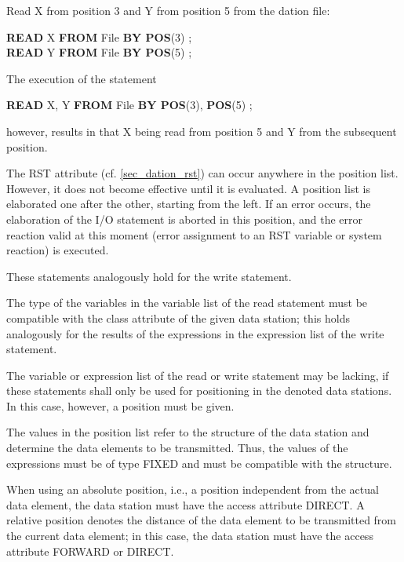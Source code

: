 Read X from position 3 and Y from position 5 from the dation file:

{\bf READ} X {\bf FROM} File {\bf BY POS}(3) ;\\
{\bf READ} Y {\bf FROM} File {\bf BY POS}(5) ;

The execution of the statement

{\bf READ} X, Y {\bf FROM} File {\bf BY POS}(3), {\bf POS}(5) ;

however, results in that X being read from position 5 and Y from the
subsequent position.

The RST attribute (cf. \ref{sec_dation_rst}) can occur anywhere in the
 position list.
However, it does not become effective until it is evaluated. A position
list is elaborated one after the other, starting from the left. If an
error occurs, the elaboration of the I/O statement is aborted in this
position, and the error reaction valid at this moment (error assignment
to an RST variable or system reaction) is executed.

These statements analogously hold for the write statement.

The type of the variables in the variable list of the read statement
must be compatible with the class attribute of the given data station;
this holds analogously for the results of the expressions in the
expression list of the write statement.

The variable or expression list of the read or write statement may be
lacking, if these statements shall only be used for positioning in the
denoted data stations. In this case, however, a position must be
given.

The values in the position list refer to the structure of the data
station and determine the data elements to be transmitted. Thus, the
values of the expressions must be of type FIXED and must be compatible
with the structure.

When using an absolute position, i.e., a position independent from the
actual data element, the data station must have the access attribute
DIRECT. A relative position denotes the distance of the data element to
be transmitted from the current data element; in this case, the data
station must have the access attribute FORWARD
 or DIRECT.

